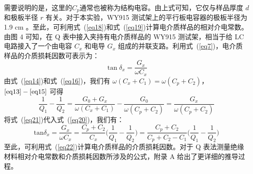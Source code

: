\documentclass[a4paper,utf8]{article}
\newcommand{\seqref}[1]{式~(\ref{#1})}
\begin{document}
\begin{enumerate}
                需要说明的是，这里的$C_p$通常也被称为结构电容。由上式可知，它仅与样品厚度 $d$ 和极板半径 $r$ 有关。对于本实验，WY915 测试架上的平行板电容器的极板半径为 1.9 \unit{\centi\metre} 。至此，可利用\seqref{eq18}和\seqref{eq19}计算电介质样品的相对介电常数。
                由图 4 可知，在 Q 表中接入夹持有电介质样品的 WY915 测试架，相当于给 LC 电路接入了一个由电容 $C_x$ 和电导 $G_x$ 组成的并联支路。利用\seqref{eq7}，电介质样品的介质损耗因数可表示为：
                \begin{equation}
                    \tan\delta_x=\frac{G_x}{\omega C_x}\label{eq20}
                \end{equation}
                由\seqref{eq14}和\seqref{eq16}，我们有 $\omega(C_{x}+C_{1})=\omega(C_{p}+C_{2})$，$\eqref{eq13}-\eqref{eq15}$ 可得
                \begin{equation}
                    \frac{1}{Q_{1}}-\frac{1}{Q_{2}}=\frac{G_{0}+G_{x}}{\omega(C_{x}+C_{1})}-\frac{G_{0}}{\omega(C_{p}+C_{2})}=\frac{G_{x}}{\omega(C_{p}+C_{2})}\label{eq21}
                \end{equation}
                将\seqref{eq21}代入\seqref{eq20}，我们有：
                \begin{equation}
                    \mathrm{tan}\delta_{x}=\frac{G_{x}}{\omega C_{x}}=\frac{C_{p}+C_{2}}{C_{x}}\biggl(\frac{1}{Q_{1}}-\frac{1}{Q_{2}}\biggr)=\frac{C_{p}+C_{2}}{C_{p}+C_{2}-C_{1}}\biggl(\frac{1}{Q_{1}}-\frac{1}{Q_{2}}\biggr)\label{eq22}
                \end{equation}
                至此，可利用\seqref{eq22}计算电介质样品的介质损耗因数。对于 Q 表法测量绝缘材料相对介电常数和介质损耗因数所涉及的公式，附录 A 给出了更详细的推导过程。
            \end{enumerate}
\end{document}
